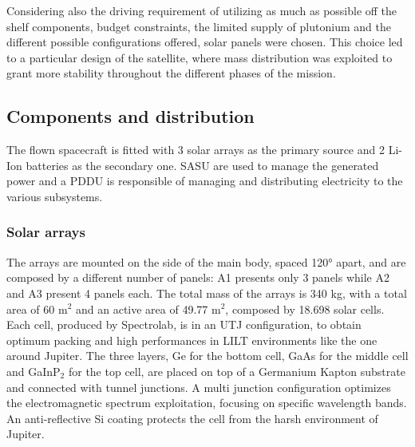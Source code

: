 Considering also the driving requirement of utilizing as much as possible off the shelf components, budget constraints, the limited supply of plutonium and the different possible configurations offered, solar panels were chosen. This choice led to a particular design of the satellite, where mass distribution was exploited to grant more stability throughout the different phases of the mission.  

\subsection{Components and distribution}
\label{subsec:components_and_distribution}

The flown spacecraft is fitted with 3 solar arrays as the primary source and 2 Li-Ion batteries as the secondary one. SASU are used to manage the generated power and a PDDU is responsible of managing and distributing electricity to the various subsystems. 
\subsubsection{Solar arrays}
\label{susubsec:solar_arrays}

The arrays are mounted on the side of the main body, spaced 120° apart, and are composed by a different number of panels: A1 presents only 3 panels while A2 and A3 present 4 panels each. The total mass of the arrays is 340 kg, with a total area of 60 m$^2$ \cite{arrays_mass} and an active area of 49.77 m$^2$, composed by 18.698 solar cells.\cite{masses_ref} 
Each cell, produced by Spectrolab, is in an UTJ configuration, to obtain optimum packing and high performances in LILT environments like the one around Jupiter. The three layers, Ge for the bottom cell, GaAs for the middle cell and GaInP$_2$ for the top cell, are placed on top of a Germanium Kapton substrate and connected with tunnel junctions. A multi junction configuration optimizes the electromagnetic spectrum exploitation, focusing on specific wavelength bands. An anti-reflective Si coating protects the cell from the harsh environment of Jupiter. 

